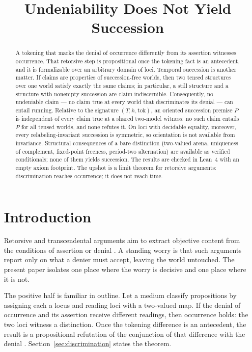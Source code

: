 \documentclass[11pt]{article}
\title{Undeniability Does Not Yield Succession}
\author{}
\date{}
\begin{document}
\maketitle
\vspace{-2em}

\begin{abstract}
A tokening that marks the denial of occurrence differently from its assertion
witnesses occurrence. That retorsive step is propositional once the tokening
fact is an antecedent, and it is formalizable over an arbitrary domain of loci.
Temporal succession is another matter. If claims are properties of
succession-free worlds, then two tensed structures over one world satisfy
exactly the same claims; in particular, a still structure and a structure with
nonempty succession are claim-indiscernible. Consequently, no undeniable claim
--- no claim true at every world that discriminates its denial --- can entail
running. Relative to the signature \((T,h,\mathrm{tok})\), an oriented
succession premise \(P\) is independent of every claim true at a shared
two-model witness: no such claim entails \(P\) for all tensed worlds, and none
refutes it. On loci with decidable equality, moreover, every
relabeling-invariant succession is symmetric, so orientation is not available
from invariance. Structural consequences of a bare distinction (two-valued
arena, uniqueness of complement, fixed-point freeness, period-two alternation)
are available as verified conditionals; none of them yields succession. The
results are checked in Lean~4 with an empty axiom footprint. The upshot is a
limit theorem for retorsive arguments: discrimination reaches occurrence; it
does not reach time.
\end{abstract}

\section{Introduction}
\label{sec:intro}

Retorsive and transcendental arguments aim to extract objective content from
the conditions of assertion or denial \cite{stroud1968,stern2000}. A standing
worry is that such arguments report only on what a denier must accept, leaving
the world untouched. The present paper isolates one place where the worry is
decisive and one place where it is not.

The positive half is familiar in outline. Let a medium classify propositions by
assigning each a locus and reading loci with a two-valued map. If the denial of
occurrence and its assertion receive different readings, then occurrence holds:
the two loci witness a distinction. Once the tokening difference is an
antecedent, the result is a propositional refutation of the conjunction of that
difference with the denial \cite{mackie1964,hintikka1962}. Section~\ref{sec:discrimination}
states the theorem.
\end{document}
